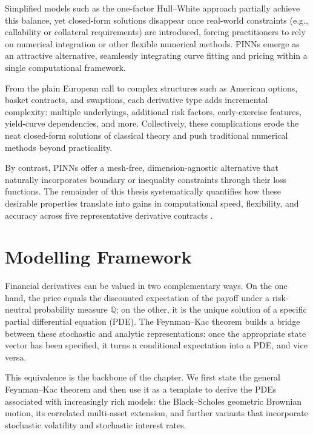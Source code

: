 \documentclass[12pt]{report} %
\theoremstyle{plain}           %
\theoremstyle{definition}      %
\theoremstyle{remark}          %
\begin{document}
Simplified models such as the one-factor Hull--White approach partially achieve this balance, yet
closed-form solutions disappear once real-world constraints (e.g., callability or collateral
requirements) are introduced, forcing practitioners to rely on numerical integration or other
flexible numerical methods. PINNs emerge as an attractive alternative, seamlessly integrating curve
fitting and pricing within a single computational framework.

From the plain European call to complex structures such as American options, basket contracts, and
swaptions, each derivative type adds incremental complexity: multiple underlyings, additional risk
factors, early-exercise features, yield-curve dependencies, and more. Collectively, these
complications erode the neat closed-form solutions of classical theory and push traditional
numerical methods beyond practicality.

By contrast, PINNs offer a mesh-free, dimension-agnostic alternative that naturally incorporates
boundary or inequality constraints through their loss functions. The remainder of this thesis
systematically quantifies how these desirable properties translate into gains in computational
speed, flexibility, and accuracy across five representative derivative contracts
\cite{huge2020differentialmachinelearning,heaton2018deeplearningfinance}.

\section{Modelling Framework}\label{sec:modelling_framework}

Financial derivatives can be valued in two complementary ways. 
On the one hand, the price equals the discounted expectation of the payoff
under a risk-neutral probability measure $\mathbb Q$; on the other, it is the
unique solution of a specific partial differential equation (PDE). 
The Feynman--Kac theorem builds a bridge between these stochastic and analytic
representations: once the appropriate state vector has been specified, it
turns a conditional expectation into a PDE, and vice versa.

This equivalence is the backbone of the chapter. 
We first state the general Feynman--Kac theorem and then use it
as a template to derive the PDEs associated with increasingly rich
models: the Black--Scholes geometric Brownian motion, its correlated
multi-asset extension, and further variants that incorporate
stochastic volatility and stochastic interest rates. 
\end{document}
